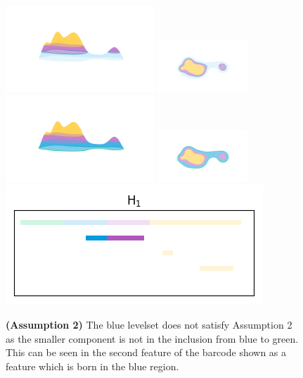 \begin{figure}[htbp]\label{fig:assumption2}
  \centering
  \includegraphics[trim=200 300 200 200, clip, width=0.5\textwidth]{scripts/figures/surf/ass2_C_side.png}
  \includegraphics[trim=300 200 200 200, clip, width=0.3\textwidth]{scripts/figures/surf/ass2_C_top.png}
  \includegraphics[trim=200 300 200 200, clip, width=0.5\textwidth]{scripts/figures/surf/ass2_B_side.png}
  \includegraphics[trim=300 200 200 200, clip, width=0.3\textwidth]{scripts/figures/surf/ass2_B_top.png}
  \includegraphics[scale=0.7]{scripts/figures/scalar_barcode_H1-masked.png}
  \caption{\textbf{(Assumption 2)} The blue levelset does not satisfy Assumption 2 as the smaller component is not in the inclusion from blue to green.
          This can be seen in the second feature of the barcode shown as a feature which is born in the blue region.}
\end{figure}

